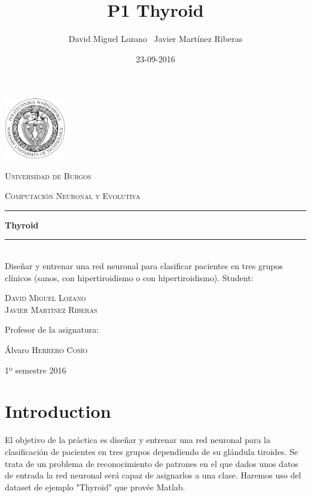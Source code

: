 \documentclass[a4paper,12pt,titlepage]{article}
\newcommand{\HRule}[1]{\rule{\linewidth}{#1}}
\begin{document}
\author{David Miguel Lozano \ Javier Martínez Riberas}
\title{P1 Thyroid}
\date{23-09-2016}

\begin{titlepage}
	\centering
	\includegraphics[width=0.2\textwidth]{images/pw-logo.png}\par
	\vspace{0.3cm}
	{\scshape\LARGE Universidad de Burgos \par}
	\vfill
	{\scshape\Large Computación Neuronal y Evolutiva \par}
	\HRule{2pt}
	{\huge\bfseries Thyroid \par}
	\HRule{2pt}
	\\ [0.5cm]
	{Diseñar y entrenar una red neuronal para clasificar pacientes en tres grupos clínicos (sanos, con hipertiroidismo o con hipertiroidismo).}
	\vfill
	Student:\par
	{\Large\scshape David Miguel Lozano \\ Javier Martínez Riberas \par}
	\vfill
	Profesor de la asignatura:\par
	Álvaro \textsc{Herrero Cosío}
	\vfill
	{\large 1º semestre 2016 \par}
\end{titlepage}

\newpage
\tableofcontents
\begin{appendix}
  \listoffigures
\end{appendix}

\newpage

\section{Introduction}

El objetivo de la práctica es diseñar y entrenar una red neuronal para la clasificación de pacientes en tres grupos dependiendo de su glándula tiroides. Se trata de un problema de reconocimiento de patrones en el que dados unos datos de entrada la red neuronal será capaz de asignarlos a una clase. Haremos uso del dataset de ejemplo "Thyroid" que provée Matlab.
\end{document}

